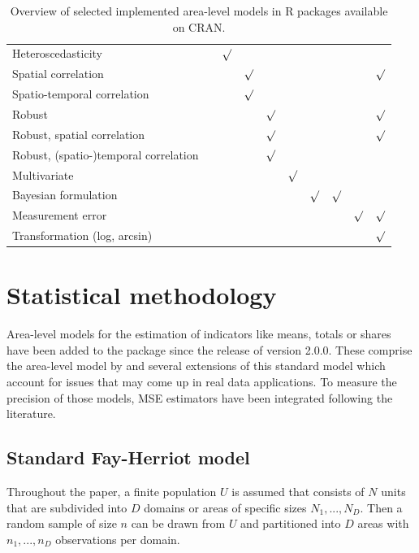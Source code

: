 \begin{table}[t!]
\begin{tabularx}{\linewidth}{@{}X @{}z @{}z @{}z @{}z @{}z  @{}z @{}z @{}z @{}z}
		\raggedright{Heteroscedasticity} 	&	&	$\surd$ &		&	&	& &		&	&	 \\
		\raggedright{Spatial correlation} 	&	&	&	$\surd$ &		&	&	& 	&	& 	$\surd$ \\
		\raggedright{Spatio-temporal correlation} 	&	&	&	$\surd$ &			& &	&	&	&	  \\
		\raggedright{Robust}  	&	&	&	&		$\surd$ &	&	&	 	& &	$\surd$ \\
		\raggedright{Robust, spatial correlation} &	&	&	&	$\surd$ &	&	& &	 &		$\surd$ \\
		\raggedright{Robust, (spatio-)temporal correlation} &	& &	&	$\surd$ &	&	&	&	&	\\
		\raggedright{Multivariate} & & & &	&		$\surd$ &	 &	&	&	 \\
		\raggedright{Bayesian formulation} 	&		&	&	&	& 	&	$\surd$ &	$\surd$ &	&	 \\
		\raggedright{Measurement error} 		&	&	&	&	&	&	& 	 &	$\surd$ &	$\surd$ \\
		\raggedright{Transformation (log, arcsin)} 		& &	& &	&	&	&	&		& $\surd$ \\ \bottomrule
	\end{tabularx}
	\caption{Overview of selected implemented area-level models in R packages
		available on CRAN.}
	\label{tab:packages}
\end{table}
%
\section[Statistical methodology]{Statistical methodology}\label{sec:models}
Area-level models for the estimation of indicators like means, totals or shares
have been added to the package since the release of version 2.0.0. These comprise the area-level
model by \citet{Fay1979} and several extensions of this standard model which account
for issues that may come up in real data applications. To measure the precision
of those models, MSE estimators have been integrated following the
literature.
%
\subsection{Standard Fay-Herriot model} \label{subsec:stdfh}
Throughout the paper, a finite population $U$ is assumed that consists of $N$
units that are subdivided into $D$ domains or areas of specific sizes
$N_1,...,N_D$. Then a random sample of size $n$ can be drawn from $U$ and
partitioned into $D$ areas with $n_1, ..., n_D$ observations per domain.

